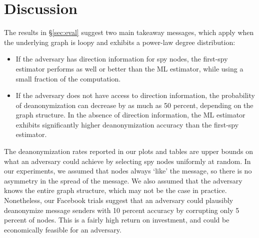 \section{Discussion}

The results in \S\ref{sec:eval} suggest two main takeaway messages, which apply when the underlying graph is loopy and exhibits a power-law degree distribution:
\begin{itemize}
\item If the adversary has direction information for spy nodes, the first-spy estimator performs as well or better than the ML estimator, while using a small fraction of the computation.
\item If the adversary does not have access to direction information, the probability of deanonymization can decrease by as much as 50 percent, depending on the graph structure. In the absence of direction information, the ML estimator exhibits significantly higher deanonymization accuracy than the first-spy estimator.
\end{itemize} 

%

%

The deanonymization rates reported in our plots and tables are upper bounds on what an adversary could achieve by selecting spy nodes uniformly at random. In our experiments, we assumed that nodes always `like' the message, so there is no asymmetry in the spread of the message. We also assumed that the adversary knows the entire graph structure, which may not be the case in practice. Nonetheless, our Facebook trials suggest that an adversary could plausibly deanonymize message senders with 10 percent accuracy by corrupting only 5 percent of nodes. This is a fairly high return on investment, and could be economically feasible for an adversary. 

